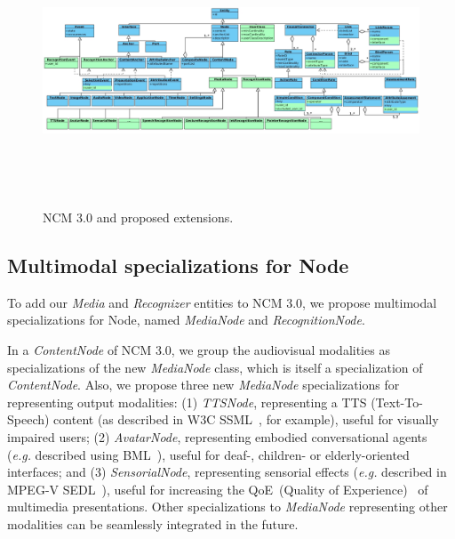 \begin{landscape}
\begin{figure}
	\begin{center}
		\includegraphics[height=8cm, keepaspectratio]{img/img11.png}
		\caption{NCM 3.0 and proposed extensions.}
		\label{fig:ncm}
	\end{center}
\end{figure}
\end{landscape}

\subsection{Multimodal specializations for Node}
\label{sec:instantiation:node}

To add our \textit{Media} and \textit{Recognizer} entities to NCM 3.0, we
propose multimodal
specializations for Node, named \textit{MediaNode} and \textit{RecognitionNode}.

In a \textit{ContentNode} of NCM 3.0, we group the audiovisual modalities as
specializations of the new \textit{MediaNode} class, which is itself a
specialization of
\textit{ContentNode}. Also, we propose three new \textit{MediaNode}
specializations for
representing output modalities: (1) \textit{TTSNode}, representing a TTS
(Text-To-Speech) content (as described in W3C
SSML~\cite{daniel_c._burnett_speech_2010}, for example), useful
for visually impaired users; (2) \textit{AvatarNode}, representing embodied
conversational agents (\textit{e.g.} described using BML~\cite{vilhjalmsson_behavior_2007}), useful for deaf-,
children- or elderly-oriented interfaces; and (3) \textit{SensorialNode},
representing
sensorial effects (\textit{e.g.} described in MPEG-V SEDL~\cite{iso/iec_iso/iec_2013}), useful for increasing
the QoE~(Quality of Experience)~\cite{ghinea_mulsemedia:_2014} of multimedia presentations. Other
specializations to \textit{MediaNode}
representing other modalities can be seamlessly integrated in the future.

